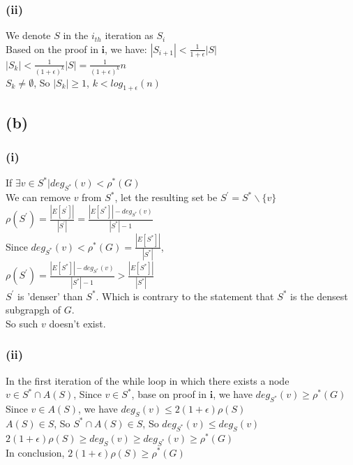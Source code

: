 \documentclass{article}
\begin{document}
\subsubsection{(ii)}
We denote $S$ in the $i_{th}$ iteration as $S_i$\\
Based on the proof in $\textbf{i}$, we have: $|S_{i+1}| < \frac{1}{1 + \epsilon}|S|$ \\
$|S_k| < \frac{1}{(1 + \epsilon)^k}|S| = \frac{1}{(1 + \epsilon)^k}n$ \\
 $S_k \ne  \emptyset$, So $|S_k| \ge 1$, $k < log_{1+\epsilon}(n)$
 
 \subsection{(b)}
 \subsubsection{(i)}
 If $\exists v \in S^* | deg_{S^*}(v) < \rho^*(G)$ \\
We can remove $v$ from $S^*$, let the resulting set be $S^\prime = S^*\backslash \{v\}$ \\
$\rho(S^\prime) = \frac{|E[S^\prime]|}{|S^\prime|} = \frac{|E[S^*]| - deg_{S^*}(v)}{|S^*| - 1}$ \\
Since $deg_{S^*}(v) < \rho^*(G) = \frac{|E[S^*]|}{|S^*|}$, \\
$\rho(S^\prime) = \frac{|E[S^*]| - deg_{S^*}(v)}{|S^*| - 1} > \frac{|E[S^*]|}{|S^*|} $ \\
$S^\prime$ is 'denser' than $S^*$. Which is contrary to the statement that $S^*$ is the densest subgrapgh of $G$. \\
So such $v$ doesn't exist.

 \subsubsection{(ii)}
In the first iteration of the while loop in which there exists a node $v \in S^* \cap A(S)$, Since $v \in S^*$, base on proof in $\textbf{i}$, we have $deg_{S^*}(v) \ge \rho^*(G)$ \\
Since $v \in A(S)$, we have $deg_{S}(v) \le 2(1+\epsilon)\rho(S)$ \\
$A(S) \in S$, So $S^* \cap A(S) \in S$, So $deg_{S^*}(v) \le deg_S(v)$ \\
$2(1+\epsilon)\rho(S) \ge deg_{S}(v) \ge deg_{S^*}(v) \ge \rho^*(G)$ \\
In conclusion, $2(1+\epsilon)\rho(S) \ge \rho^*(G)$
\end{document}
